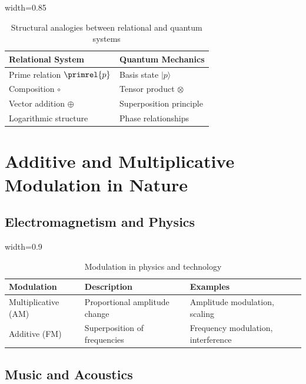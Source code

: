 	\begin{table}[htbp]
		\centering
		\begin{adjustbox}{width=0.85\textwidth}
			\begin{tabular}{ll}
				\toprule
				\textbf{Relational System} & \textbf{Quantum Mechanics} \\
				\midrule
				Prime relation $\primrel{p}$ & Basis state $|p\rangle$ \\
				Composition $\circ$ & Tensor product $\otimes$ \\
				Vector addition $\oplus$ & Superposition principle \\
				Logarithmic structure & Phase relationships \\
				\bottomrule
			\end{tabular}
		\end{adjustbox}
		\caption{Structural analogies between relational and quantum systems}
		\label{tab:quantenanalogien}
	\end{table}
	
	\section{Additive and Multiplicative Modulation in Nature}
	
	\subsection{Electromagnetism and Physics}
	
	\begin{table}[htbp]
		\centering
		\begin{adjustbox}{width=0.9\textwidth}
			\begin{tabular}{lll}
				\toprule
				\textbf{Modulation} & \textbf{Description} & \textbf{Examples} \\
				\midrule
				Multiplicative (AM) & Proportional amplitude change & Amplitude modulation, scaling \\
				Additive (FM) & Superposition of frequencies & Frequency modulation, interference \\
				\bottomrule
			\end{tabular}
		\end{adjustbox}
		\caption{Modulation in physics and technology}
		\label{tab:modulation}
	\end{table}
	
	\subsection{Music and Acoustics}
	
